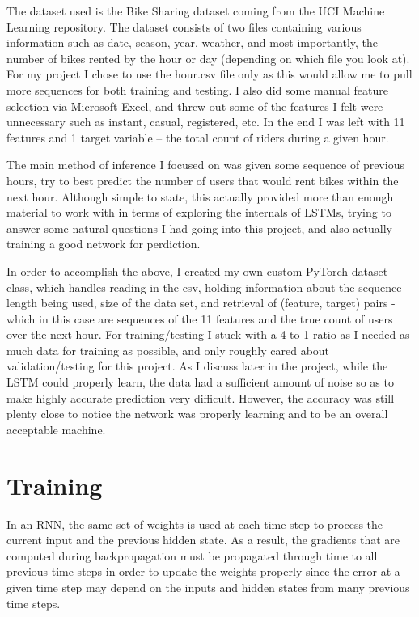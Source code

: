 \documentclass[12pt, twoside]{report}
\begin{document}
The dataset used is the Bike Sharing dataset coming from the UCI Machine Learning repository. The dataset consists of
two files containing various information such as date, season, year, weather, and most importantly, the
number of bikes rented by the hour or day (depending on which file you look at). For my project I chose
to use the hour.csv file only as this would allow me to pull more sequences for both training and testing.
I also did some manual feature selection via Microsoft Excel, and threw out some of the features I felt were
unnecessary such as instant, casual, registered, etc. In the end I was left with 11 features and 1 target variable –
the total count of riders during a given hour.

The main method of inference I focused on was given some sequence of previous hours, try to best predict the 
number of users that would rent bikes within the next hour. Although simple to state, this actually provided more
than enough material to work with in terms of exploring the internals of LSTMs, trying to answer some natural questions
I had going into this project, and also actually training a good network for perdiction.

In order to accomplish the above, I created my own custom PyTorch dataset class, which handles reading in the csv,
holding information about the sequence length being used, size of the data set, and retrieval of (feature, target) pairs - 
which in this case are sequences of the 11 features and the true count of users over the next hour.
For training/testing I stuck with a 4-to-1 ratio as I needed as much data for training as possible, and only
roughly cared about validation/testing for this project. As I discuss later in the project, while the LSTM
could properly learn, the data had a sufficient amount of noise so as to make highly accurate prediction very difficult.
However, the accuracy was still plenty close to notice the network was properly learning and to be an overall
acceptable machine.

\section{Training}

In an RNN, the same set of weights is used at each time step to process the current input and the previous hidden state.
As a result, the gradients that are computed during backpropagation must be propagated through time to all previous 
time steps in order to update the weights properly since the error at a given time step may depend on the 
inputs and hidden states from many previous time steps.
\end{document}
